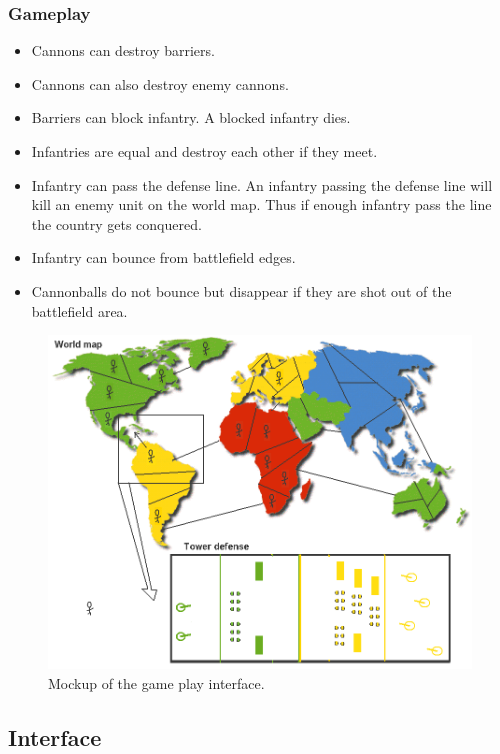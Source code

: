 \documentclass[12pt,a4paper]{article}
\begin{document}
\subsubsection{Gameplay}
\begin{itemize}
\item Cannons can destroy barriers.
\item Cannons can also destroy enemy cannons.
\item Barriers can block infantry. A blocked infantry dies.
\item Infantries are equal and destroy each other if they meet.
\item Infantry can pass the defense line. An infantry passing the defense
  line will kill an enemy unit on the world map. Thus if enough
  infantry pass the line the country gets conquered.
\item Infantry can bounce from battlefield edges. 
\item Cannonballs do not bounce but disappear if they are shot out of
  the battlefield area.
\end{itemize}

\begin{figure}[h!]
\centering
\includegraphics[width=13cm]{pic/rules.png}
\caption{Mockup of the game play interface.}
\label{fig:gameplay}
\end{figure}

\subsection{Interface}
\end{document}

